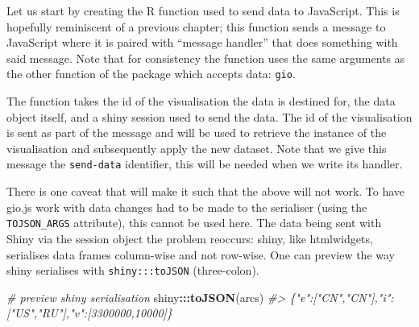\documentclass[
  10pt,
]{krantz}
\makeatletter
\newenvironment{Shaded}{\begin{snugshade}}{\end{snugshade}}
\newcommand{\CommentTok}[1]{\textcolor[rgb]{0.37,0.37,0.37}{\textit{#1}}}
\newcommand{\ControlFlowTok}[1]{\textcolor[rgb]{0.27,0.27,0.27}{\textbf{#1}}}
\newcommand{\DataTypeTok}[1]{\textcolor[rgb]{0.27,0.27,0.27}{#1}}
\newcommand{\KeywordTok}[1]{\textcolor[rgb]{0.27,0.27,0.27}{\textbf{#1}}}
\newcommand{\NormalTok}[1]{#1}
\newcommand{\OperatorTok}[1]{\textcolor[rgb]{0.43,0.43,0.43}{\textbf{#1}}}
\newcommand{\StringTok}[1]{\textcolor[rgb]{0.5,0.5,0.5}{#1}}
\newenvironment{kframe}{%
\medskip{}
\setlength{\fboxsep}{.8em}
 \def\at@end@of@kframe{}%
 \ifinner\ifhmode%
  \def\at@end@of@kframe{\end{minipage}}%
  \begin{minipage}{\columnwidth}%
 \fi\fi%
 \def\FrameCommand##1{\hskip\@totalleftmargin \hskip-\fboxsep
 \colorbox{shadecolor}{##1}\hskip-\fboxsep
     \hskip-\linewidth \hskip-\@totalleftmargin \hskip\columnwidth}%
 \MakeFramed {\advance\hsize-\width
   \@totalleftmargin\z@ \linewidth\hsize
   \@setminipage}}%
 {\par\unskip\endMakeFramed%
 \at@end@of@kframe}
\renewenvironment{Shaded}{\begin{kframe}}{\end{kframe}}
\makeatother
\begin{document}
Let us start by creating the R function used to send data to JavaScript. This is hopefully reminiscent of a previous chapter; this function sends a message to JavaScript where it is paired with ``message handler'' that does something with said message. Note that for consistency the function uses the same arguments as the other function of the package which accepts data: \texttt{gio}.

\begin{Shaded}
\end{Shaded}

The function takes the id of the visualisation the data is destined for, the data object itself, and a shiny session used to send the data. The id of the visualisation is sent as part of the message and will be used to retrieve the instance of the visualisation and subsequently apply the new dataset. Note that we give this message the \texttt{send-data} identifier, this will be needed when we write its handler.

There is one caveat that will make it such that the above will not work. To have gio.js work with data changes had to be made to the serialiser (using the \texttt{TOJSON\_ARGS} attribute), this cannot be used here. The data being sent with Shiny via the session object the problem reoccurs: shiny, like htmlwidgets, serialises data frames column-wise and not row-wise. One can preview the way shiny serialises with \texttt{shiny:::toJSON} (three-colon).

\begin{Shaded}
\begin{Highlighting}[]
\CommentTok{\# preview shiny serialisation}
\NormalTok{shiny}\OperatorTok{:::}\KeywordTok{toJSON}\NormalTok{(arcs)}
\CommentTok{\#> \{"e":["CN","CN"],"i":["US","RU"],"v":[3300000,10000]\}}
\end{Highlighting}
\end{Shaded}
\end{document}
